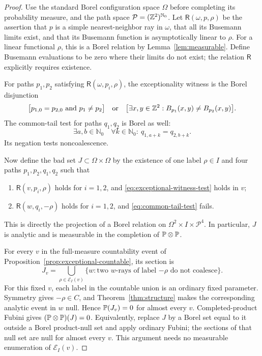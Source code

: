 \begin{proof}
Use the standard Borel configuration space $\Omega$ before completing
its probability measure, and the path space
$\mathcal P=(\mathbb Z^2)^{\mathbb N_0}$.  Let
$\mathsf R(\omega,p,\rho)$ be the assertion that $p$ is a simple
nearest-neighbor ray in $\omega$, that all its Busemann limits exist,
and that its Busemann function is asymptotically linear to $\rho$.
For a linear functional $\rho$, this is a Borel relation by
Lemma~\ref{lem:measurable}. Define Busemann evaluations to be zero
where their limits do not exist; the relation $\mathsf R$ explicitly
requires existence.

For paths $p_1,p_2$ satisfying $\mathsf R(\omega,p_i,\rho)$, the
exceptionality witness is the Borel disjunction
\begin{equation}
 \bigl[p_{1,0}=p_{2,0}\ \text{and}\ p_1\ne p_2\bigr]
 \quad\text{or}\quad
 \bigl[\exists x,y\in\mathbb Z^2:
 B_{p_1}(x,y)\ne B_{p_2}(x,y)\bigr].
 \label{eq:exceptional-witness-test}
\end{equation}
The common-tail test for paths $q_1,q_2$ is Borel as well:
\begin{equation}
 \exists a,b\in\mathbb N_0\quad
 \forall k\in\mathbb N_0:\ q_{1,a+k}=q_{2,b+k}.
 \label{eq:common-tail-test}
\end{equation}
Its negation tests noncoalescence.

Now define the bad set $J\subset\Omega\times\Omega$ by the existence
of one label $\rho\in I$ and four paths $p_1,p_2,q_1,q_2$ such that
\begin{enumerate}[label=(\alph*)]
\item $\mathsf R(v,p_i,\rho)$ holds for $i=1,2$, and
      \eqref{eq:exceptional-witness-test} holds in $v$;
\item $\mathsf R(w,q_i,-\rho)$ holds for $i=1,2$, and
      \eqref{eq:common-tail-test} fails.
\end{enumerate}
This is directly the projection of a Borel relation on
$\Omega^2\times I\times\mathcal P^4$.  In particular, $J$ is
analytic and is measurable in the completion of $\mathbb P\otimes\mathbb P$.

For every $v$ in the full-measure countability event of
Proposition~\ref{prop:exceptional-countable}, its section is
\begin{equation}
 J_v=\bigcup_{\rho\in\mathcal E_I(v)}
 \{w:\text{two $w$-rays of label $-\rho$ do not coalesce}\}.
 \label{eq:countable-null-section}
\end{equation}
For this fixed $v$, each label in the countable union is an ordinary
fixed parameter.  Symmetry gives $-\rho\in C$, and
Theorem~\ref{thm:structure} makes the corresponding analytic event
in $w$ null.  Hence $\mathbb P(J_v)=0$ for almost every $v$.
Completed-product Fubini gives
$(\mathbb P\otimes\mathbb P)(J)=0$.  Equivalently, replace $J$ by a Borel set
equal to it outside a Borel product-null set and apply ordinary
Fubini; the sections of that null set are null for almost every
$v$.  This argument needs no measurable enumeration of
$\mathcal E_I(v)$.


\end{proof}

